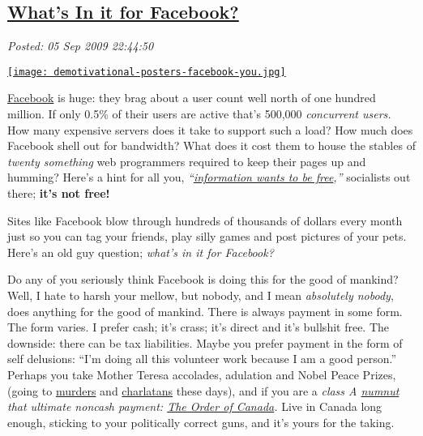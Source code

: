 %

\subsection*{\href{https://bakerjd99.wordpress.com/2009/09/05/whats-in-it-for-facebook/}{What's In it for Facebook?}}


\noindent\emph{Posted: 05 Sep 2009 22:44:50}
\vspace{6pt}

\begin{floatingfigure}[l]{0.40\textwidth}
\centering
\href{http://verydemotivational.memebase.com/}{\texttt{[image: demotivational-posters-facebook-you.jpg]}}
\label{fig:3X0}
\end{floatingfigure}
\href{http://www.facebook.com}{Facebook} is
huge: they brag about a user count well north of one hundred million. If
only 0.5\% of their users are active that's 500,000 \emph{concurrent users.}
How many expensive servers does it take to
support such a load? How much does Facebook shell out for bandwidth?
What does it cost them to house the stables of \emph{twenty something}
web programmers required to keep their pages up and humming? Here's a
hint for all you,
\emph{``\href{http://en.wikipedia.org/wiki/Information\_wants\_to\_be\_free}{information
wants to be free},''} socialists out there; \textbf{it's not free!}

Sites like Facebook blow through hundreds of thousands of dollars every
month just so you can tag your friends, play silly games and post
pictures of your pets. Here's an old guy question; \emph{what's in it
for Facebook?}

Do any of you seriously think Facebook is doing this for the good of
mankind? Well, I hate to harsh your mellow, but nobody, and I mean
\emph{absolutely nobody}, does anything for the good of mankind. There
is always payment in some form. The form varies. I prefer cash; it's
crass; it's direct and it's bullshit free. The downside: there can be
tax liabilities. Maybe you prefer payment in the form of self delusions:
``I'm doing all this volunteer work because I am a good person.''
Perhaps you take Mother Teresa accolades, adulation and Nobel Peace
Prizes, (going to
\href{http://nobelprize.org/nobel\_prizes/peace/laureates/1994/arafat-bio.html}{murders}
and
\href{http://nobelprize.org/nobel\_prizes/peace/laureates/2007/}{charlatans}
these days), and if you are a \emph{class A
\href{http://www.urbandictionary.com/define.php?term=numnut}{numnut}
that ultimate noncash payment:
\href{http://www.gg.ca/honours/nat-ord/oc/index\_e.asp}{The Order of
Canada}.} Live in Canada long enough, sticking to your politically
correct guns, and it's yours for the taking.

